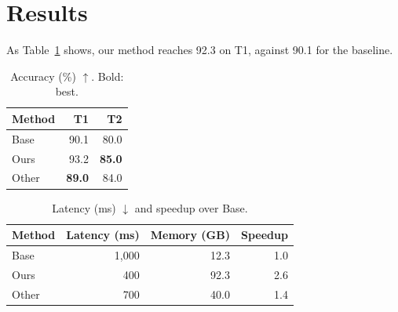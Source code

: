 \documentclass{article}
\newcommand{\win}[1]{\textbf{#1}}
\begin{document}
\begin{abstract}
Our index is 2.3$\times$ faster than the baseline at the same accuracy.
\end{abstract}
\section{Results}
As Table~\ref{tab:acc} shows, our method reaches 92.3 on T1, against 90.1 for the baseline.
\begin{table}[h]\centering\caption{Accuracy (\%) $\uparrow$. Bold: best.}\label{tab:acc}
\begin{tabular}{lrr}
\toprule
Method & T1 & T2 \\
\midrule
Base & 90.1 & 80.0 \\
Ours & 93.2 & \win{85.0} \\
Other & \win{89.0} & 84.0 \\
\bottomrule
\end{tabular}\end{table}
\begin{table}[h]\centering\caption{Latency (ms) $\downarrow$ and speedup over Base.}\label{tab:lat}
\begin{tabular}{lrrr}
\toprule
Method & Latency (ms) & Memory (GB) & Speedup \\
\midrule
Base & 1,000 & 12.3 & 1.0 \\
Ours & 400 & 92.3 & 2.6 \\
Other & 700 & 40.0 & 1.4 \\
\bottomrule
\end{tabular}\end{table}
\end{document}
